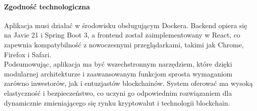 \paragraph{Zgodność technologiczna}
Aplikacja musi działać w środowisku obsługującym Dockera. Backend opiera się na Javie 21 i Spring Boot 3, a frontend został zaimplementowany w React, co zapewnia kompatybilność z nowoczesnymi przeglądarkami, takimi jak Chrome, Firefox i Safari.\\


Podsumowując, aplikacja ma być wszechstronnym narzędziem, które dzięki modularnej architekturze i zaawansowanym funkcjom sprosta wymaganiom zarówno inwestorów, jak i entuzjastów blockchainów. System oferować ma wysoką elastyczność i bezpieczeństwo, co uczyni go odpowiednim rozwiązaniem dla dynamicznie zmieniającego się rynku kryptowalut i technologii blockchain.

